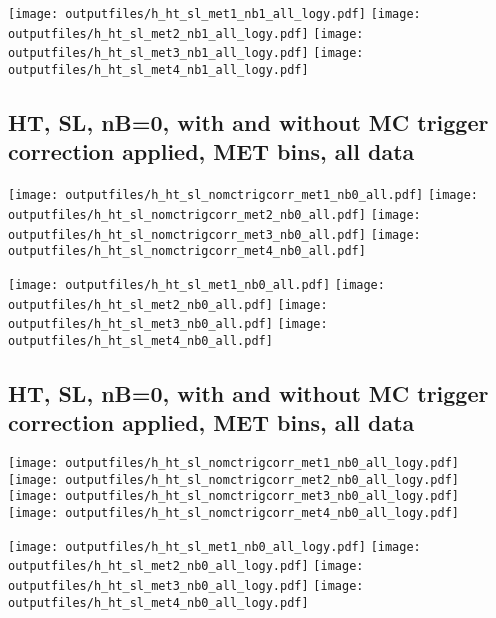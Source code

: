 \documentclass[11pt]{article}
\begin{document}
    \noindent
     \texttt{[image: outputfiles/h\_ht\_sl\_met1\_nb1\_all\_logy.pdf]}
     \texttt{[image: outputfiles/h\_ht\_sl\_met2\_nb1\_all\_logy.pdf]}
     \texttt{[image: outputfiles/h\_ht\_sl\_met3\_nb1\_all\_logy.pdf]}
     \texttt{[image: outputfiles/h\_ht\_sl\_met4\_nb1\_all\_logy.pdf]}

   \clearpage
     \subsection{ HT, SL, nB=0, with and without MC trigger correction applied, MET bins, all data}

    \noindent
     \texttt{[image: outputfiles/h\_ht\_sl\_nomctrigcorr\_met1\_nb0\_all.pdf]}
     \texttt{[image: outputfiles/h\_ht\_sl\_nomctrigcorr\_met2\_nb0\_all.pdf]}
     \texttt{[image: outputfiles/h\_ht\_sl\_nomctrigcorr\_met3\_nb0\_all.pdf]}
     \texttt{[image: outputfiles/h\_ht\_sl\_nomctrigcorr\_met4\_nb0\_all.pdf]}

    \noindent
     \texttt{[image: outputfiles/h\_ht\_sl\_met1\_nb0\_all.pdf]}
     \texttt{[image: outputfiles/h\_ht\_sl\_met2\_nb0\_all.pdf]}
     \texttt{[image: outputfiles/h\_ht\_sl\_met3\_nb0\_all.pdf]}
     \texttt{[image: outputfiles/h\_ht\_sl\_met4\_nb0\_all.pdf]}

   \clearpage
     \subsection{ HT, SL, nB=0, with and without MC trigger correction applied, MET bins, all data}

    \noindent
     \texttt{[image: outputfiles/h\_ht\_sl\_nomctrigcorr\_met1\_nb0\_all\_logy.pdf]}
     \texttt{[image: outputfiles/h\_ht\_sl\_nomctrigcorr\_met2\_nb0\_all\_logy.pdf]}
     \texttt{[image: outputfiles/h\_ht\_sl\_nomctrigcorr\_met3\_nb0\_all\_logy.pdf]}
     \texttt{[image: outputfiles/h\_ht\_sl\_nomctrigcorr\_met4\_nb0\_all\_logy.pdf]}

    \noindent
     \texttt{[image: outputfiles/h\_ht\_sl\_met1\_nb0\_all\_logy.pdf]}
     \texttt{[image: outputfiles/h\_ht\_sl\_met2\_nb0\_all\_logy.pdf]}
     \texttt{[image: outputfiles/h\_ht\_sl\_met3\_nb0\_all\_logy.pdf]}
     \texttt{[image: outputfiles/h\_ht\_sl\_met4\_nb0\_all\_logy.pdf]}
\end{document}
